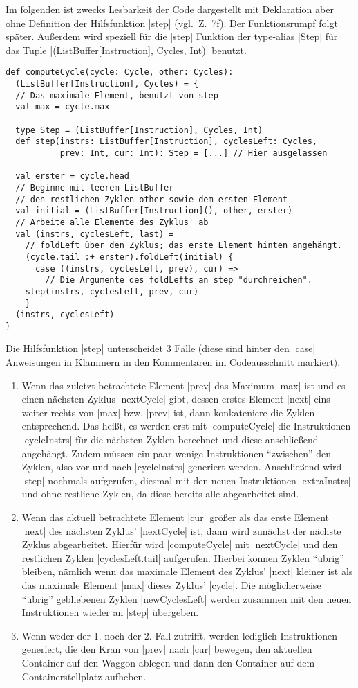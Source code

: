 Im folgenden ist zwecks Lesbarkeit der Code dargestellt mit Deklaration aber ohne Definition der Hilfsfunktion |step| (vgl.\ Z.\ 7f).
Der Funktionsrumpf folgt später.
Außerdem wird speziell für die |step| Funktion der type-alias |Step| für das Tuple |(ListBuffer[Instruction], Cycles, Int)| benutzt.
\lstset{basicstyle=\ttfamily}
\begin{lstlisting}
def computeCycle(cycle: Cycle, other: Cycles):
  (ListBuffer[Instruction], Cycles) = {
  // Das maximale Element, benutzt von step
  val max = cycle.max

  type Step = (ListBuffer[Instruction], Cycles, Int)
  def step(instrs: ListBuffer[Instruction], cyclesLeft: Cycles,
           prev: Int, cur: Int): Step = [...] // Hier ausgelassen

  val erster = cycle.head
  // Beginne mit leerem ListBuffer
  // den restlichen Zyklen other sowie dem ersten Element
  val initial = (ListBuffer[Instruction](), other, erster)
  // Arbeite alle Elemente des Zyklus' ab
  val (instrs, cyclesLeft, last) =
    // foldLeft über den Zyklus; das erste Element hinten angehängt.
    (cycle.tail :+ erster).foldLeft(initial) {
      case ((instrs, cyclesLeft, prev), cur) =>
        // Die Argumente des foldLefts an step "durchreichen".
	step(instrs, cyclesLeft, prev, cur)
    }
  (instrs, cyclesLeft)
}
\end{lstlisting}
\lstset{basicstyle=\ttfamily}
Die Hilfsfunktion |step| unterscheidet 3 Fälle (diese sind hinter den |case| Anweisungen in Klammern in den Kommentaren im Codeausschnitt markiert).
\begin{enumerate}
 \item Wenn das zuletzt betrachtete Element |prev| das Maximum |max| ist und es einen nächsten Zyklus |nextCycle| gibt,
       dessen erstes Element |next| eins weiter rechts von |max| bzw. |prev| ist, dann konkateniere die Zyklen entsprechend.
       Das heißt, es werden erst mit |computeCycle| die Instruktionen |cycleInstrs| für die nächsten Zyklen berechnet
       und diese anschließend angehängt. Zudem müssen ein paar wenige Instruktionen ``zwischen'' den Zyklen,
       also vor und nach |cycleInstrs| generiert werden. Anschließend wird |step| nochmals aufgerufen,
       diesmal mit den neuen Instruktionen |extraInstrs| und ohne restliche Zyklen, da diese bereits alle abgearbeitet sind.
 \item Wenn das aktuell betrachtete Element |cur| größer als das erste Element |next| des nächsten Zyklus' |nextCycle| ist,
       dann wird zunächst der nächste Zyklus abgearbeitet.
       Hierfür wird |computeCycle| mit |nextCycle| und den restlichen Zyklen |cyclesLeft.tail| aufgerufen.
       Hierbei können Zyklen ``übrig'' bleiben,
       nämlich wenn das maximale Element des Zyklus' |next| kleiner ist als das maximale Element |max| dieses Zyklus' |cycle|.
       Die möglicherweise ``übrig'' gebliebenen Zyklen |newCyclesLeft| werden zusammen mit den neuen Instruktionen wieder an |step| übergeben.
 \item Wenn weder der 1. noch der 2. Fall zutrifft, werden lediglich Instruktionen generiert,
       die den Kran von |prev| nach |cur| bewegen, den aktuellen Container auf den Waggon ablegen und dann den Container auf dem Containerstellplatz aufheben.
\end{enumerate}
